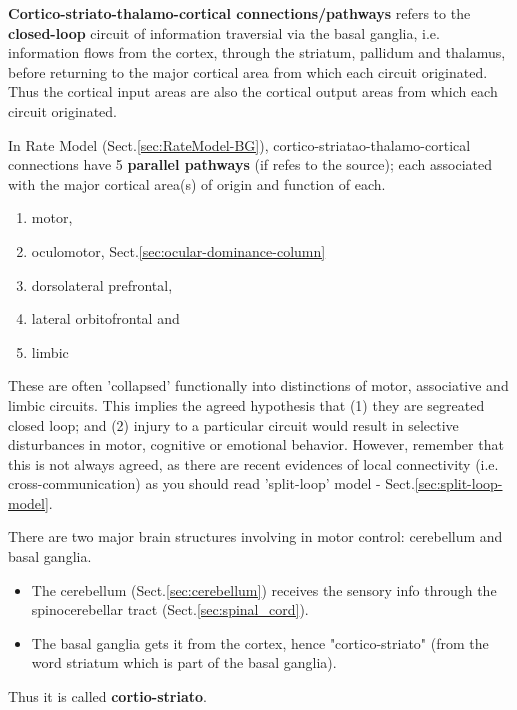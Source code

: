 {\bf Cortico-striato-thalamo-cortical connections/pathways} refers to the
{\bf closed-loop} circuit of information traversial via the basal ganglia, i.e.
information flows from the cortex, through the striatum, pallidum and thalamus,
before returning to the major cortical area from which each circuit originated.
Thus the cortical input areas are also the cortical output areas from which each
circuit originated.

In Rate Model (Sect.\ref{sec:RateModel-BG}), cortico-striatao-thalamo-cortical
connections have 5 {\bf parallel pathways} (if refes to the source); each
associated with the major cortical area(s) of origin and function of each.
\begin{enumerate}
  \item motor, 
  
  \item oculomotor, Sect.\ref{sec:ocular-dominance-column}
  
  \item dorsolateral prefrontal, 
  
  \item lateral orbitofrontal and

  \item limbic
\end{enumerate}
These are often 'collapsed' functionally into distinctions of motor, associative
and limbic circuits. This implies the agreed hypothesis that (1) they are
segreated closed loop; and (2) injury to a particular circuit would result in
selective disturbances in motor, cognitive or emotional behavior. 
However, remember that this is not always agreed, as 
there are recent evidences of local connectivity (i.e. cross-communication) as
you should read 'split-loop' model - Sect.\ref{sec:split-loop-model}.

There are two major brain structures involving in motor control:
cerebellum and basal ganglia.

\begin{itemize}
  \item The cerebellum (Sect.\ref{sec:cerebellum}) receives the sensory info through the 
spinocerebellar tract (Sect.\ref{sec:spinal_cord}).

  \item The basal ganglia gets it from the cortex, hence "cortico-striato" (from
  the word striatum which is part of the basal ganglia).   
\end{itemize}
Thus it is called {\bf cortio-striato}.

